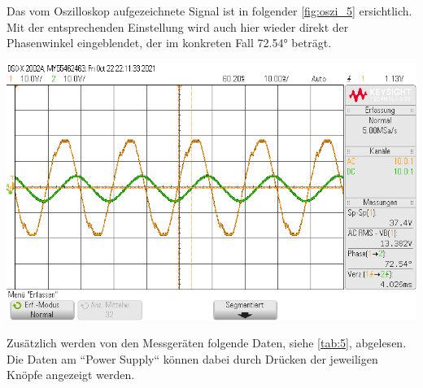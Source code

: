 \documentclass[11pt,ngerman]{scrartcl}
\begin{document}
Das vom Oszilloskop aufgezeichnete Signal ist in folgender \autoref{fig:oszi_5} ersichtlich. Mit der entsprechenden Einstellung wird auch hier wieder direkt der Phasenwinkel eingeblendet, der im konkreten Fall 72.54° beträgt.

\begin{center}
	\begin{minipage}[t]{0.7\textwidth}
		\includegraphics[width=\textwidth]{Phasenzeug/scope_10}
		\label{fig:oszi_5}
	\end{minipage}
\end{center}

Zusätzlich werden von den Messgeräten folgende Daten, siehe \autoref{tab:5}, abgelesen. Die Daten am ``Power Supply`` können dabei durch Drücken der jeweiligen Knöpfe angezeigt werden.
\end{document}

